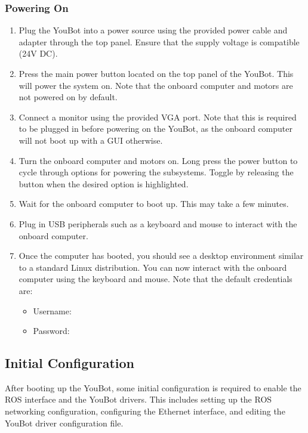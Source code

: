 \documentclass[a4paper, 12pt]{article}
\newcommand{\code}[1]{\texttt{\detokenize{#1}}}
\begin{document}
    \subsubsection{Powering On}
    \begin{enumerate}[topsep=0pt, noitemsep]
        \item Plug the YouBot into a power source using the provided power cable and adapter through the top panel. Ensure that the supply voltage is compatible (24V DC).
        \item Press the main power button located on the top panel of the YouBot. This will power the system on. Note that the onboard computer and motors are not powered on by default. 
        \item Connect a monitor using the provided VGA port. Note that this is required to be plugged in before powering on the YouBot, as the onboard computer will not boot up with a GUI otherwise. 
        \item Turn the onboard computer and motors on. Long press the power button to cycle through options for powering the subsystems. Toggle by releasing the button when the desired option is highlighted. 
        \item Wait for the onboard computer to boot up. This may take a few minutes. 
        \item Plug in USB peripherals such as a keyboard and mouse to interact with the onboard computer.
        \item Once the computer has booted, you should see a desktop environment similar to a standard Linux distribution. You can now interact with the onboard computer using the keyboard and mouse. Note that the default credentials are: 
        \begin{itemize}[topsep=0pt, noitemsep]
            \item Username: \code{youbot}
            \item Password: \code{youbot}
        \end{itemize}
    \end{enumerate}


    \subsection{Initial Configuration}
    \label{appendix:initial_configuration}

    After booting up the YouBot, some initial configuration is required to enable the ROS interface and the YouBot drivers. This includes setting up the ROS networking configuration, configuring the Ethernet interface, and editing the YouBot driver configuration file. 
\end{document}
